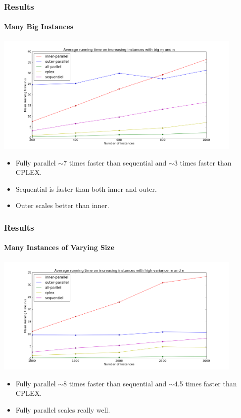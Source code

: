 \documentclass{beamer}
\begin{document}
\begin{frame}[fragile]
\frametitle{Results}
\framesubtitle{Many Big Instances}
\centering
\includegraphics[width=0.9\textwidth]{../Doc/figures/many-big}
\begin{itemize}
	\item Fully parallel $\sim$7 times faster than sequential and $\sim$3 times faster than CPLEX.
	\item Sequential is faster than both inner and outer.
	\item Outer scales better than inner.
\end{itemize}
\end{frame}

\begin{frame}[fragile]
\frametitle{Results}
\framesubtitle{Many Instances of Varying Size}
\centering
\includegraphics[width=0.9\textwidth]{../Doc/figures/many-varying}
\begin{itemize}
	\item Fully parallel $\sim$8 times faster than sequential and $\sim$4.5 times faster than CPLEX.
	\item Fully parallel scales really well.
\end{itemize}
\end{frame}
\end{document}
